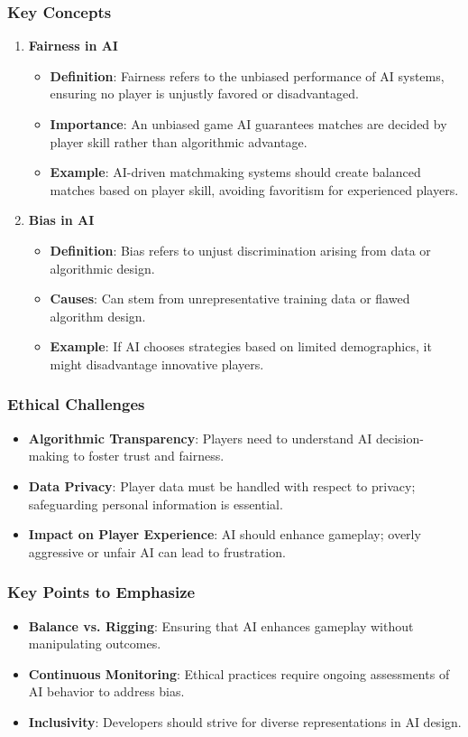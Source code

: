 \documentclass[aspectratio=169]{beamer}
\begin{document}
\begin{frame}[fragile]
  \frametitle{Key Concepts}
  \begin{enumerate}
    \item \textbf{Fairness in AI}
      \begin{itemize}
        \item \textbf{Definition}: Fairness refers to the unbiased performance of AI systems, ensuring no player is unjustly favored or disadvantaged.
        \item \textbf{Importance}: An unbiased game AI guarantees matches are decided by player skill rather than algorithmic advantage.
        \item \textbf{Example}: AI-driven matchmaking systems should create balanced matches based on player skill, avoiding favoritism for experienced players.
      \end{itemize}
      
    \item \textbf{Bias in AI}
      \begin{itemize}
        \item \textbf{Definition}: Bias refers to unjust discrimination arising from data or algorithmic design.
        \item \textbf{Causes}: Can stem from unrepresentative training data or flawed algorithm design.
        \item \textbf{Example}: If AI chooses strategies based on limited demographics, it might disadvantage innovative players.
      \end{itemize}
  \end{enumerate}
\end{frame}

\begin{frame}[fragile]
  \frametitle{Ethical Challenges}
  \begin{itemize}
    \item \textbf{Algorithmic Transparency}: Players need to understand AI decision-making to foster trust and fairness.
    \item \textbf{Data Privacy}: Player data must be handled with respect to privacy; safeguarding personal information is essential.
    \item \textbf{Impact on Player Experience}: AI should enhance gameplay; overly aggressive or unfair AI can lead to frustration.
  \end{itemize}
\end{frame}

\begin{frame}[fragile]
  \frametitle{Key Points to Emphasize}
  \begin{itemize}
    \item \textbf{Balance vs. Rigging}: Ensuring that AI enhances gameplay without manipulating outcomes.
    \item \textbf{Continuous Monitoring}: Ethical practices require ongoing assessments of AI behavior to address bias.
    \item \textbf{Inclusivity}: Developers should strive for diverse representations in AI design.
  \end{itemize}
\end{frame}
\end{document}
